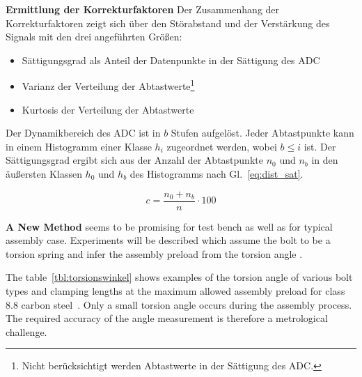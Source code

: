 \begin{multicols}{2}
\begin{mdboxshad}
			
				{\textbf{Ermittlung der Korrekturfaktoren} Der Zusammenhang der Korrekturfaktoren zeigt sich über den Störabstand und der Verstärkung des Signals mit den drei angeführten Größen: 
					\begin{itemize}
						\item Sättigungsgrad als Anteil der Datenpunkte in der Sättigung des ADC
						\item Varianz der Verteilung der Abtastwerte\footnote[1]{Nicht berücksichtigt werden Abtastwerte in der Sättigung des ADC.\label{foot:bereinigt}}
						\item Kurtosis der Verteilung der Abtastwerte
					\end{itemize}
					Der Dynamikbereich des ADC ist in $b$ Stufen aufgelöst. Jeder Abtastpunkte kann in einem Histogramm einer Klasse $h_i$ zugeordnet werden, wobei $b \leq i$ ist. Der Sättigungsgrad ergibt sich aus der Anzahl der Abtastpunkte $n_0$ und $n_b$ in den äußersten Klassen $h_0$ und $h_b$ des Histogramms nach Gl.~\eqref{eq:dist_sat}.
					
					\begin{equation}
						\label{eq:dist_sat}
						c = \frac{n_0 + n_b}{n} \cdot 100
					\end{equation}
				}
				
			\end{mdboxshad} 
			\vspace{10mm}
			\begin{mdboxshad}
				{\textbf{A New Method} seems to be promising for test bench as well as for typical assembly case. Experiments will be described which assume the bolt to be a torsion spring and infer the assembly preload from the torsion angle \Ator. 
					
					The table~\ref{tbl:torsionswinkel} shows examples of the torsion angle of various bolt types and clamping lengths at the maximum allowed assembly preload for class {8.8} carbon steel~\cite{VDI2230}. Only a small torsion angle \Ator occurs during the assembly process. The required accuracy of the angle measurement is therefore a metrological challenge.
				}
				

\end{mdboxshad}
\end{multicols}

